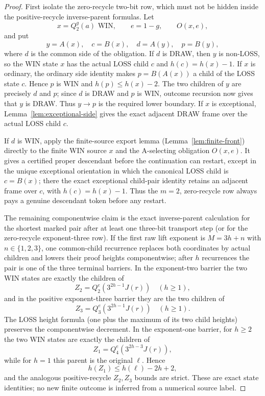 \begin{proof}
First isolate the zero-recycle two-bit row, which must not be hidden inside
the positive-recycle inverse-parent formulas.  Let
\[
 x=Q_2^g(a)\text{ WIN},\qquad e=1-g,\qquad O(x,e),
\]
and put
\[
 y=A(x),\quad c=B(x),\quad d=A(y),\quad p=B(y),
\]
where $d$ is the common side of the obligation.  If $d$ is DRAW, then $y$ is non-LOSS, so the WIN state $x$ has the
actual LOSS child $c$ and $h(c)=h(x)-1$.  If $x$ is ordinary, the ordinary
side identity makes $p=B(A(x))$ a child of the LOSS state $c$.  Hence $p$ is
WIN and $h(p)\le h(x)-2$.  The two children of $y$ are precisely $d$ and
$p$; since $d$ is DRAW and $p$ is WIN, outcome recursion now gives that $y$
is DRAW.  Thus $y\to p$ is the required lower boundary.  If $x$ is
exceptional, Lemma~\ref{lem:exceptional-side} gives the exact adjacent DRAW
frame over the actual LOSS child $c$.

If $d$ is WIN, apply the finite-source export lemma
(Lemma~\ref{lem:finite-front}) directly to the finite WIN source $x$ and the
A-selecting obligation $O(x,e)$.  It gives a certified proper descendant
before the continuation can restart, except in the unique exceptional
orientation in which the canonical LOSS child is $c=B(x)$; there the exact
exceptional child-pair identity retains an adjacent frame over $c$, with
$h(c)=h(x)-1$.  Thus the $m=2$, zero-recycle row always pays a genuine
descendant token before any restart.

The remaining componentwise claim is the exact inverse-parent calculation for
the shortest marked pair after at least one three-bit transport step (or for
the zero-recycle exponent-three row).  If the first raw lift exponent is $M=3h+n$ with
$n\in\{1,2,3\}$, one common-child recurrence replaces both coordinates by
actual children and lowers their proof heights componentwise; after $h$
recurrences the pair is one of the three terminal barriers.  In the
exponent-two barrier the two WIN states are exactly the children of
\[
 Z_2=Q_2^e(3^{2h-1}J(r))\quad(h\ge1),
\]
and in the positive exponent-three barrier they are the two children of
\[
 Z_3=Q_3^e(3^{2h-1}J(r))\quad(h\ge1).
\]
The LOSS height formula (one plus the maximum of its two child heights)
preserves the componentwise decrement.  In the exponent-one barrier, for
$h\ge2$ the two WIN states are exactly the children of
\[
 Z_1=Q_4^e(3^{2h-3}J(r)),
\]
while for $h=1$ this parent is the original $\ell$.  Hence
\[
 h(Z_1)\le h(\ell)-2h+2,
\]
and the analogous positive-recycle $Z_2,Z_3$ bounds are strict.  These are
exact state identities; no new finite outcome is inferred from a numerical
source label.


\end{proof}
